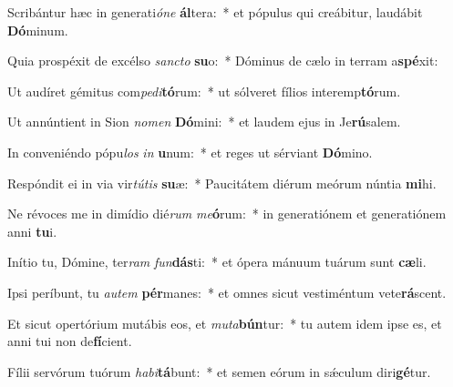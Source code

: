 \item Scribántur hæc in generati\textit{ó}\textit{ne} \textbf{ál}tera:~* et pópulus qui creábitur, laudábit \textbf{Dó}minum.
\item Quia prospéxit de excélso \textit{sanc}\textit{to} \textbf{su}o:~* Dóminus de cælo in terram a\textbf{spé}xit:
\item Ut audíret gémitus com\textit{pe}\textit{di}\textbf{tó}rum:~* ut sólveret fílios interemp\textbf{tó}rum.
\item Ut annúntient in Sion \textit{no}\textit{men} \textbf{Dó}mini:~* et laudem ejus in Je\textbf{rú}salem.
\item In conveniéndo pópu\textit{los} \textit{in} \textbf{u}num:~* et reges ut sérviant \textbf{Dó}mino.
\item Respóndit ei in via vir\textit{tú}\textit{tis} \textbf{su}æ:~* Paucitátem diérum meórum núntia \textbf{mi}hi.
\item Ne révoces me in dimídio dié\textit{rum} \textit{me}\textbf{ó}rum:~* in generatiónem et generatiónem anni \textbf{tu}i.
\item Inítio tu, Dómine, ter\textit{ram} \textit{fun}\textbf{dás}ti:~* et ópera mánuum tuárum sunt \textbf{cæ}li.
\item Ipsi períbunt, tu \textit{au}\textit{tem} \textbf{pér}manes:~* et omnes sicut vestiméntum vete\textbf{rá}scent.
\item Et sicut opertórium mutábis eos, et \textit{mu}\textit{ta}\textbf{bún}tur:~* tu autem idem ipse es, et anni tui non de\textbf{fí}cient.
\item Fílii servórum tuórum \textit{ha}\textit{bi}\textbf{tá}bunt:~* et semen eórum in sǽculum diri\textbf{gé}tur.
